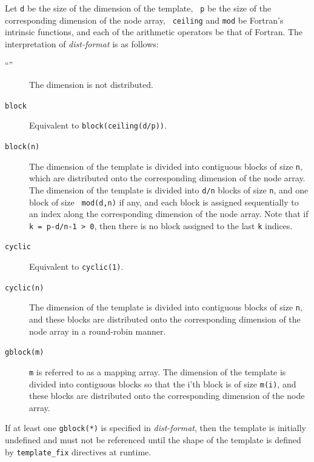 Let {\tt d} be the size of the dimension of the template, {\tt
p} be the size of the corresponding dimension of the node array, {\tt
ceiling} and {\tt mod} be Fortran's intrinsic functions, and each of the
arithmetic operators be that of Fortran.
%
The interpretation of {\it dist-format} is as follows:

\begin{description}
\item[``{\tt *}'']
	   The dimension is not distributed.

\item[{\tt block}]
	   Equivalent to {\tt block(ceiling(d/p))}.

\item[{\tt block(n)}]

	   The dimension of the template is divided into
	   contiguous blocks of size {\tt n}, which are distributed onto
	   the corresponding dimension of the node array.
%
	   The dimension of the template is divided into {\tt d/n}
	   blocks of size {\tt n}, and one block of size {\tt
	   mod(d,n)} if any, and each block is assigned sequentially
	   to an index along the corresponding dimension of the node
	   array.
%
	   Note that if {\tt k = p-d/n-1 > 0}, then there is no block
	   assigned to the last {\tt k} indices.


\item[{\tt cyclic}]
	   Equivalent to {\tt cyclic(1)}.

\item[{\tt cyclic(n)}]
	   The dimension of the template is divided into
	   contiguous blocks of size {\tt n}, and these blocks are
	   distributed onto the corresponding dimension of the node
	   array in a round-robin manner.

\item[{\tt gblock(m)}]
	   {\tt m} is referred to as a mapping array. The dimension of
	   the template is divided into contiguous blocks so that the
	   i'th block is of size {\tt m(i)}, and these blocks are
	   distributed onto the corresponding dimension of the node array.
\end{description}

If at least one {\tt gblock(*)} is specified in {\it dist-format},
then the template is initially undefined and must not be referenced
until the shape of the template is defined by {\tt template\_fix}
directives at runtime.


